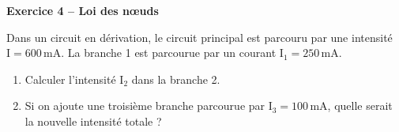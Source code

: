 \documentclass[11pt,a4paper]{article}
\newcommand{\cadreblanc}[1]{%
\medskip\framebox[\linewidth][c]{%
\rule{0mm}{#1mm}}\par
\medskip}
\begin{document}
\cadreblanc{25}

\textbf{Exercice 4 -- Loi des nœuds}

Dans un circuit en dérivation, le circuit principal est parcouru par une intensité $\mathrm{I} = 600\,\text{mA}$. La branche 1 est parcourue par un courant $\mathrm{I}_1 = 250\,\text{mA}$.
\begin{enumerate}
    \item Calculer l'intensité $\mathrm{I}_2$ dans la branche 2.
    \item Si on ajoute une troisième branche parcourue par $\mathrm{I}_3 = 100\,\text{mA}$, quelle serait la nouvelle intensité totale ?
\end{enumerate}

\cadreblanc{25}
\end{document}
